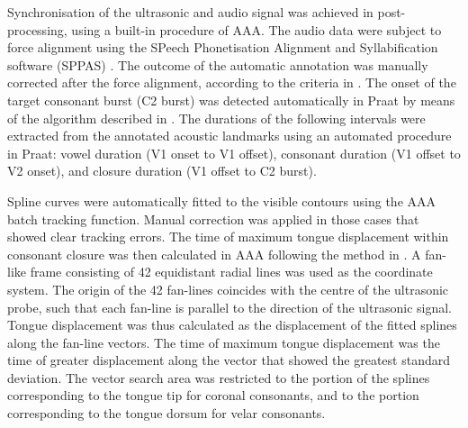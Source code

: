 \documentclass[authoryear, 5p]{elsarticle}
\begin{document}
Synchronisation of the ultrasonic and audio signal was achieved in
post-processing, using a built-in procedure of AAA. The audio data were
subject to force alignment using the SPeech Phonetisation Alignment and
Syllabification software (SPPAS) \citep{bigi2015}. The outcome of the
automatic annotation was manually corrected after the force alignment,
according to the criteria in . The onset of the
target consonant burst (C2 burst) was detected automatically in Praat
\citep{boersma2016} by means of the algorithm described in
\citet{ananthapadmanabha2014}. The durations of the following intervals
were extracted from the annotated acoustic landmarks using an automated
procedure in Praat: vowel duration (V1 onset to V1 offset), consonant
duration (V1 offset to V2 onset), and closure duration (V1 offset to C2
burst).


Spline curves were automatically fitted to the visible contours using
the AAA batch tracking function. Manual correction was applied in those
cases that showed clear tracking errors. The time of maximum tongue
displacement within consonant closure was then calculated in AAA
following the method in \citet{strycharczuk2015}. A fan-like frame
consisting of 42 equidistant radial lines was used as the coordinate
system. The origin of the 42 fan-lines coincides with the centre of the
ultrasonic probe, such that each fan-line is parallel to the direction
of the ultrasonic signal. Tongue displacement was thus calculated as the
displacement of the fitted splines along the fan-line vectors. The time
of maximum tongue displacement was the time of greater displacement
along the vector that showed the greatest standard deviation. The vector
search area was restricted to the portion of the splines corresponding
to the tongue tip for coronal consonants, and to the portion
corresponding to the tongue dorsum for velar consonants.
\end{document}
